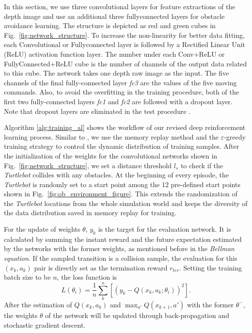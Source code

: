 In this section, we use three convolutional layers for feature extractions of the depth image and use an additional three fullyconnected layers for obstacle avoidance learning. The structure is depicted as red and green cubes in Fig.~\ref{fig:network_structure}. To increase the non-linearity for better data fitting, each Convolutional or Fullyconnected layer is followed by a Rectified Linear Unit (ReLU) activation function layer.
The number under each Conv+ReLU or FullyConnected+ReLU cube is the number of channels of the output data related to this cube. The network takes one depth raw image as the input. The five channels of the final fully-connected layer \textit{fc3} are the values of the five moving commands. Also, to avoid the overfitting in the training procedure, both of the first two fully-connected layers \textit{fc1} and \textit{fc2} are followed with a dropout layer. Note that dropout layers are eliminated in the test procedure \cite{srivastava2014dropout}.

Algorithm \ref{alg:training_al} shows the workflow of our revised deep reinforcement learning process. Similar to \cite{mnih2015human}, we use the memory replay method and the $\varepsilon$-greedy training strategy to control the dynamic distribution of training samples. After the initialization of the weights for the convolutional networks shown in Fig.~\ref{fig:network_structure}, we set a distance threshold $l_s$ to check if the \textit{Turtlebot} collides with any obstacles. At the beginning of every episode, the \textit{Turtlebot} is randomly set to a start point among the 12 pre-defined start points shown in Fig.~\ref{fig:ob_environment_figure}.
This extends the randomization of the \textit{Turtlebot} locations from the whole simulation world and keeps the diversity of the data distribution saved in memory replay for training.

For the update of weights $\theta$, $y_k$ is the target for the evaluation network. It is calculated by summing the instant reward and the future expectation estimated by the networks with the former weights, as mentioned before in the \textit{Bellman equation}. If the sampled transition is a collision sample, the evaluation for this $(x_k , a_k)$ pair is directly set as the termination reward $r_{ter}$. Setting the training batch size to be $n$, the loss function is
\[
L({\theta}_i) = \frac{1}{n} \sum_{k}^{n}[(y_k-Q(x_k,a_k;{\theta}_i))^2].
\]
After the estimation of $Q(x_k, a_k)$ and $\max_{a'} Q(x_{k+1},a')$ with the former $\theta^-$, the weights $\theta$ of the network will be updated through back-propagation and stochastic gradient descent.
